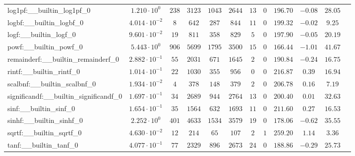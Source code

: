 \begin{tabular}{|l|c|c|c|c|c|c|c|c|c|c|c|}
log1pf:\_\_builtin\_log1pf\_0             & $ 1.210 \cdot 10^{0}  $ & $ 238    $ & $ 3123  $ & $ 1043  $ & $ 2644  $ & $ 13  $ & $ 0 $ & $ 196.70      $ & $ -0.08   $ & $ 28.05   $ \\
logbf:\_\_builtin\_logbf\_0               & $ 4.014 \cdot 10^{-2} $ & $ 8      $ & $ 642   $ & $ 287   $ & $ 844   $ & $ 11  $ & $ 0 $ & $ 199.32      $ & $ -0.02   $ & $ 9.25    $ \\
logf:\_\_builtin\_logf\_0                 & $ 9.601 \cdot 10^{-2} $ & $ 19     $ & $ 811   $ & $ 358   $ & $ 829   $ & $ 5   $ & $ 0 $ & $ 197.90      $ & $ -0.05   $ & $ 20.19   $ \\
powf:\_\_builtin\_powf\_0                 & $ 5.443 \cdot 10^{0}  $ & $ 906    $ & $ 5699  $ & $ 1795  $ & $ 3500  $ & $ 15  $ & $ 0 $ & $ 166.44      $ & $ -1.01   $ & $ 41.67   $ \\
remainderf:\_\_builtin\_remainderf\_0     & $ 2.882 \cdot 10^{-1} $ & $ 55     $ & $ 2031  $ & $ 671   $ & $ 1645  $ & $ 2   $ & $ 0 $ & $ 190.84      $ & $ -0.24   $ & $ 16.75   $ \\
rintf:\_\_builtin\_rintf\_0               & $ 1.014 \cdot 10^{-1} $ & $ 22     $ & $ 1030  $ & $ 355   $ & $ 956   $ & $ 0   $ & $ 0 $ & $ 216.87      $ & $ 0.39    $ & $ 16.94   $ \\
scalbnf:\_\_builtin\_scalbnf\_0           & $ 1.934 \cdot 10^{-2} $ & $ 4      $ & $ 378   $ & $ 148   $ & $ 379   $ & $ 2   $ & $ 0 $ & $ 206.78      $ & $ 0.16    $ & $ 7.19    $ \\
significandf:\_\_builtin\_significandf\_0 & $ 1.697 \cdot 10^{-1} $ & $ 34     $ & $ 2689  $ & $ 944   $ & $ 2764  $ & $ 13  $ & $ 0 $ & $ 200.40      $ & $ 0.01    $ & $ 32.63   $ \\
sinf:\_\_builtin\_sinf\_0                 & $ 1.654 \cdot 10^{-1} $ & $ 35     $ & $ 1564  $ & $ 632   $ & $ 1693  $ & $ 11  $ & $ 0 $ & $ 211.60      $ & $ 0.27    $ & $ 16.53   $ \\
sinhf:\_\_builtin\_sinhf\_0               & $ 2.252 \cdot 10^{0}  $ & $ 401    $ & $ 4633  $ & $ 1534  $ & $ 3579  $ & $ 19  $ & $ 0 $ & $ 178.06      $ & $ -0.62   $ & $ 35.55   $ \\
sqrtf:\_\_builtin\_sqrtf\_0               & $ 4.630 \cdot 10^{-2} $ & $ 12     $ & $ 214   $ & $ 65    $ & $ 107   $ & $ 2   $ & $ 1 $ & $ 259.20      $ & $ 1.14    $ & $ 3.36    $ \\
tanf:\_\_builtin\_tanf\_0                 & $ 4.077 \cdot 10^{-1} $ & $ 77     $ & $ 2329  $ & $ 896   $ & $ 2673  $ & $ 24  $ & $ 0 $ & $ 188.86      $ & $ -0.29   $ & $ 25.73   $ \\

\end{tabular}

